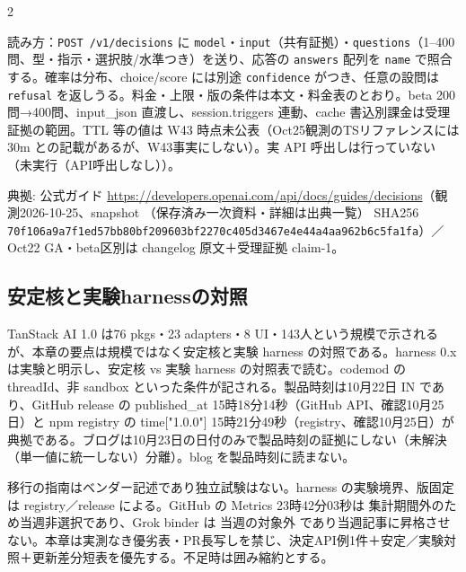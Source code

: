 \documentclass[lualatex,a4paper,10pt]{jlreq}
\begin{document}
\begin{multicols}{2} %


読み方：\texttt{POST /v1/decisions} に \texttt{model}・\texttt{input}（共有証拠）・\texttt{questions}（1–400問、型・指示・選択肢/水準つき）を送り、応答の \texttt{answers} 配列を \texttt{name} で照合する。確率は分布、choice/score には別途 \texttt{confidence} がつき、任意の設問は \texttt{refusal} を返しうる。料金・上限・版の条件は本文・料金表のとおり。beta 200問→400問、input\_json 直渡し、session.triggers 連動、cache 書込別課金は受理証拠の範囲。TTL 等の値は W43 時点未公表（Oct25観測のTSリファレンスには 30m との記載があるが、W43事実にしない）。実 API 呼出しは行っていない（未実行（API呼出しなし））。

典拠: 公式ガイド \url{https://developers.openai.com/api/docs/guides/decisions}（観測2026-10-25、snapshot （保存済み一次資料・詳細は出典一覧） SHA256 \nolinkurl{70f106a9a7f1ed57bb80bf209603bf2270c405d3467e4e44a4aa962b6c5fa1fa}）／Oct22 GA・beta区別は changelog 原文＋受理証拠 claim-1。


\subsection*{安定核と実験harnessの対照}


TanStack AI 1.0 は76 pkgs・23 adapters・8 UI・143人という規模で示されるが、本章の要点は規模ではなく安定核と実験 harness の対照である。harness 0.x は実験と明示し、安定核 vs 実験 harness の対照表で読む。codemod の threadId、非 sandbox といった条件が記される。製品時刻は10月22日 IN であり、GitHub release の published\_at 15時18分14秒（GitHub API、確認10月25日）と npm registry の time["1.0.0"] 15時21分49秒（registry、確認10月25日）が典拠である。ブログは10月23日の日付のみで製品時刻の証拠にしない（未解決（単一値に統一しない）分離）。blog を製品時刻に読まない。


移行の指南はベンダー記述であり独立試験はない。harness の実験境界、版固定は registry／release による。GitHub の Metrics 23時42分03秒は 集計期間外のため当週非選択であり、Grok binder は 当週の対象外 であり当週記事に昇格させない。本章は実測なき優劣表・PR長写しを禁じ、決定API例1件＋安定／実験対照＋更新差分短表を優先する。不足時は囲み縮約とする。


\end{multicols} %
\end{document}
